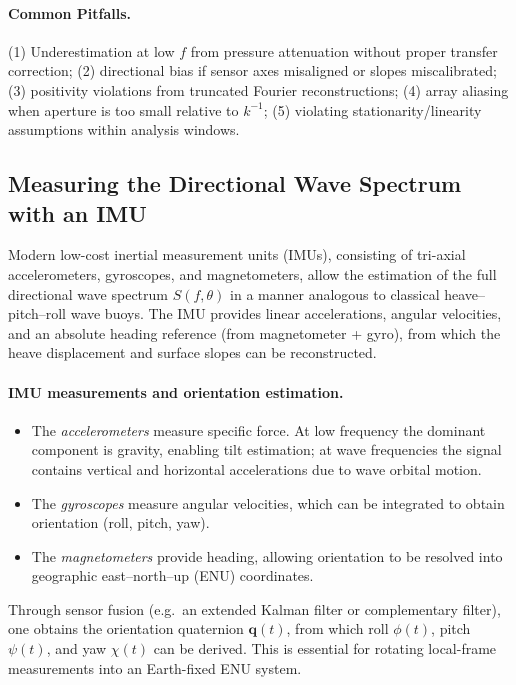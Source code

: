 \documentclass[11pt]{article}
\begin{document}
\paragraph{Common Pitfalls.}
(1) Underestimation at low $f$ from pressure attenuation without proper transfer correction; (2) directional bias if sensor axes misaligned or slopes miscalibrated; (3) positivity violations from truncated Fourier reconstructions; (4) array aliasing when aperture is too small relative to $k^{-1}$; (5) violating stationarity/linearity assumptions within analysis windows.


\subsection{Measuring the Directional Wave Spectrum with an IMU}
\label{subsec:imu-directional-spectrum}

Modern low-cost inertial measurement units (IMUs), consisting of tri-axial accelerometers, gyroscopes, and magnetometers, allow the estimation of the full directional wave spectrum $S(f,\theta)$ in a manner analogous to classical heave--pitch--roll wave buoys. The IMU provides linear accelerations, angular velocities, and an absolute heading reference (from magnetometer + gyro), from which the heave displacement and surface slopes can be reconstructed.

\paragraph{IMU measurements and orientation estimation.}
\begin{itemize}
  \item The \emph{accelerometers} measure specific force. At low frequency the dominant component is gravity, enabling tilt estimation; at wave frequencies the signal contains vertical and horizontal accelerations due to wave orbital motion.
  \item The \emph{gyroscopes} measure angular velocities, which can be integrated to obtain orientation (roll, pitch, yaw).
  \item The \emph{magnetometers} provide heading, allowing orientation to be resolved into geographic east--north--up (ENU) coordinates.
\end{itemize}
Through sensor fusion (e.g.\ an extended Kalman filter or complementary filter), one obtains the orientation quaternion $\mathbf{q}(t)$, from which roll $\phi(t)$, pitch $\psi(t)$, and yaw $\chi(t)$ can be derived. This is essential for rotating local-frame measurements into an Earth-fixed ENU system.
\end{document}
